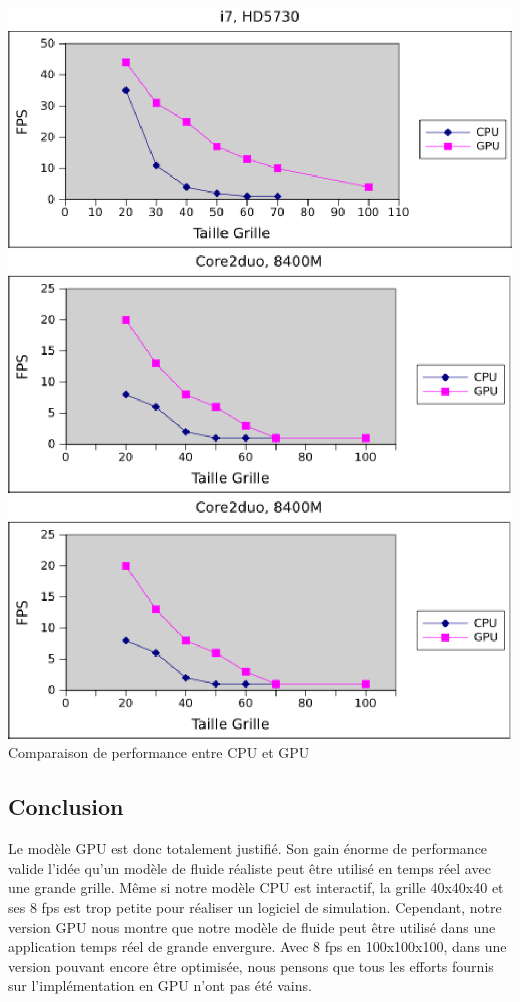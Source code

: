 \documentclass[a4paper,10pt]{article}
\begin{document}
  \begin{center}
	\includegraphics[scale=1]{Grille1.ps}\\
	\includegraphics[scale=1]{Grille2.ps}\\
	\includegraphics[scale=1]{Grille2.ps}\\
	Comparaison de performance entre CPU et GPU
  \end{center}
 




\subsection{Conclusion}
Le modèle GPU est donc totalement justifié. Son gain énorme de performance valide l'idée
qu'un modèle de fluide réaliste peut être utilisé en temps réel avec une grande grille. 
Même si notre modèle CPU est interactif, la grille 40x40x40 et ses 8 fps est
trop petite pour réaliser un logiciel de simulation. Cependant, notre version GPU
nous montre que notre modèle de fluide peut être utilisé dans une application 
temps réel de grande envergure. Avec 8 fps en 100x100x100, dans une version
pouvant encore être optimisée, nous pensons que tous les efforts fournis
sur l'implémentation en GPU n'ont pas été vains. 
\end{document}

